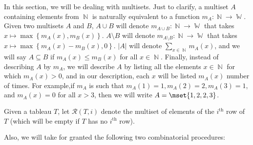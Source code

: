 \documentclass[11pt,reqno]{amsart}
\DeclareMathOperator{\N}{\mathbb{N}}
\DeclareMathOperator{\W}{\mathbb{W}}
\theoremstyle{definition}
\numberwithin{equation}{section}
\begin{document}
\begin{convention} \label{conv:multiset}
In this section, we will be dealing with multisets. Just to clarify, a multiset $A$ containing elements from $\N$ is naturally equivalent to a function $m_A: \N \rightarrow \W$. Given two multisets $A$ and $B$, $A \cup B$ will denote $m_{A \cup B}: \N \rightarrow \W$ that takes $x \mapsto \max\left\{m_A(x), m_B(x)\right\}$. $A \setminus B$ will denote $m_{A \setminus B} : \N \rightarrow \W$ that takes $x \mapsto \max\left\{m_A(x) - m_B(x), 0\right\}$. $|A|$ will denote $\sum_{x \in \N} m_A(x)$, and we will say $A \subseteq B$ if $m_A(x) \le m_B(x)$ for all $x \in \N$. Finally, instead of describing $A$ by $m_A$, we will describe $A$ by listing all the elements $x \in \N$ for which $m_A(x) > 0$, and in our description, each $x$ will be listed $m_A(x)$ number of times. For example,if $m_A$ is such that $m_A(1) = 1, m_A(2) = 2, m_A(3) = 1$, and $m_A(x) = 0$ for all $x > 3$, then we will write $A = \mset{1, 2, 2, 3}$.
\end{convention}

\begin{notation}
Given a tableau $T$, let $\mathcal{R}(T, i)$ denote the multiset of elements of the $i^{\text{th}}$ row of $T$ (which will be empty if $T$ has no $i^{\text{th}}$ row). 
\end{notation}

Also, we will take for granted the following two combinatorial procedures:

\newcommand{\getadsh}{\textsc{get-admissible-shapes}\xspace}
\newcommand{\getadsbd}{\textsc{get-admissible-standard-bd}\xspace}
\newcommand{\getvalidalt}{\textsc{get-LCMs-valid-in-$A_{lt}$}\xspace}
\end{document}
